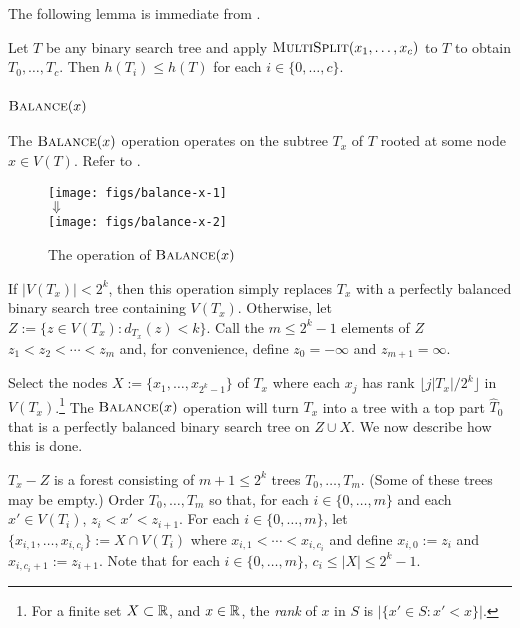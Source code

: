 \documentclass[kpfonts]{patmorin}
\let\le\leqslant
\begin{document}
The following lemma is immediate from . 
\begin{lem}
  Let $T$ be any binary search tree and apply $\textsc{MultiSplit}(x_1,\ldots,x_c)$ to $T$ to obtain $T_0,\ldots,T_c$.  Then $h(T_i)\le h(T)$ for each $i\in\{0,\ldots,c\}$.
\end{lem}

\subsubsection{$\textsc{Balance}(x)$}

The $\textsc{Balance}(x)$ operation operates on the subtree $T_x$ of $T$ rooted at some node $x\in V(T)$.   Refer to .

\begin{figure}
    \begin{center}
      \texttt{[image: figs/balance-x-1]} \\[-2ex]
      $\Downarrow$ \\[1ex]
      \texttt{[image: figs/balance-x-2]}
    \end{center}  
  \caption{The operation of $\textsc{Balance}(x)$}
\end{figure}

If $|V(T_x)|< 2^k$, then this operation simply replaces $T_x$ with a perfectly balanced binary search tree containing $V(T_x)$.  Otherwise, let $Z:=\{z\in V(T_x): d_{T_x}(z)< k\}$.  Call the $m\le 2^k-1$ elements of $Z$  $z_1<z_2<\cdots<z_{m}$ and, for convenience, define $z_0=-\infty$ and $z_{m+1}=\infty$.

Select the nodes $X:=\{x_1,\ldots,x_{2^k-1}\}$ of $T_x$ where each $x_j$ has rank $\lfloor j|T_x|/2^k\rfloor$ in $V(T_x)$.\footnote{For a finite set $X\subset\mathbb{R}$, and $x\in\mathbb{R}$, the \emph{rank} of $x$ in $S$ is $|\{x'\in S: x'<x\}|$.}  The $\textsc{Balance}(x)$ operation will turn $T_x$ into a tree with a top part $\hat{T}_0$ that is a perfectly balanced binary search tree on $Z\cup X$.  We now describe how this is done.

$T_x-Z$ is a forest consisting of $m+1\le 2^{k}$ trees $T_0,\ldots,T_m$. (Some of these trees may be empty.)  Order $T_{0},\ldots,T_m$ so that, for each $i\in\{0,\ldots,m\}$ and each $x'\in V(T_i)$, $z_i< x' < z_{i+1}$.  For each $i\in\{0,\ldots,m\}$, let $\{x_{i,1},\ldots,x_{i,c_i}\}:=X\cap V(T_i)$ where $x_{i,1}<\cdots<x_{i,c_i}$ and define $x_{i,0}:=z_i$ and $x_{i,c_i+1}:=z_{i+1}$. Note that for each $i\in\{0,\ldots,m\}$, $c_i\le |X|\le 2^k-1$.
\end{document}
